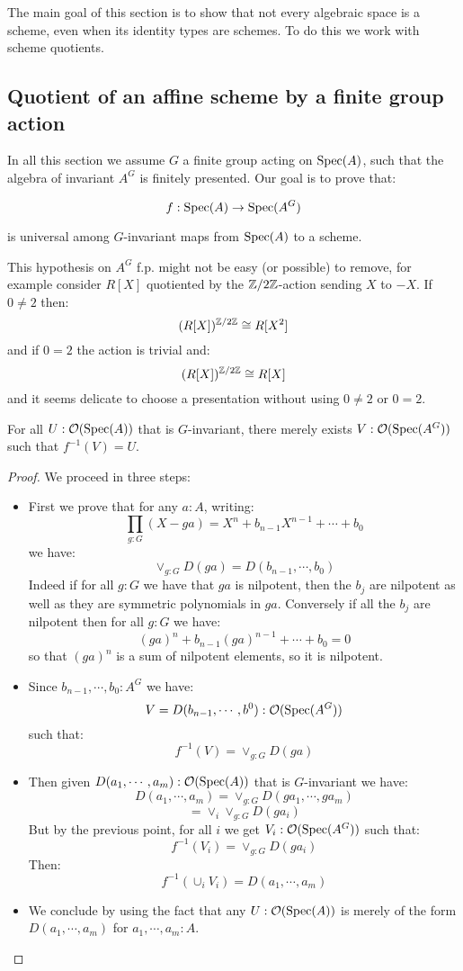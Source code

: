 The main goal of this section is to show that not every algebraic space is a scheme, even when its identity types are schemes. To do this we work with scheme quotients.

\subsection{Quotient of an affine scheme by a finite group action}

In all this section we assume $G$ a finite group acting on $\operatorname{Spec}(A)$, such that the algebra of invariant $A^G$ is finitely presented. Our goal is to prove that:

\[f:\operatorname{Spec}(A)\to \operatorname{Spec}(A^G)\] 

is universal among $G$-invariant maps from $\operatorname{Spec}(A)$ to a scheme.

\begin{remark}
This hypothesis on $A^G$ f.p. might not be easy (or possible) to remove, for example consider $R[X]$ quotiented by the $\mathbb{Z}/2\mathbb{Z}$-action sending $X$ to $-X$. If $0\not=2$ then:
\[(R[X])^{\mathbb{Z}/2\mathbb{Z}} \cong R[X^2]\]
and if $0=2$ the action is trivial and:
\[(R[X])^{\mathbb{Z}/2\mathbb{Z}} \cong R[X]\]
and it seems delicate to choose a presentation without using  $0\not=2$ or $0=2$.
\end{remark}

\begin{lemma}\label{surjective-on-open}
For all $U: \mathcal{O}(\operatorname{Spec}(A))$ that is $G$-invariant, there merely exists $V:\mathcal{O}(\operatorname{Spec}(A^G))$ such that $f^{-1}(V)=U$.
\end{lemma}

\begin{proof}
We proceed in three steps:
\begin{itemize}
\item First we prove that for any $a:A$, writing:
\[\prod_{g:G}(X-ga) = X^n + b_{n-1}X^{n-1} + \cdots + b_0\]
we have:
\[ \lor_{g:G} D(ga) = D(b_{n-1},\cdots,b_0)\]
Indeed if for all $g:G$ we have that $ga$ is nilpotent, then the $b_j$ are nilpotent as well as they are symmetric polynomials in $ga$. Conversely if all the $b_j$ are nilpotent then for all $g:G$ we have:
\[(ga)^n + b_{n-1}(ga)^{n-1} + \cdots + b_0 = 0\]
so that $(ga)^n$ is a sum of nilpotent elements, so it is nilpotent.

\item Since $b_{n-1},\cdots,b_0:A^G$ we have:
\[V = D(b_{n-1},\cdots,b^0):\mathcal{O}(\operatorname{Spec}(A^G))\]
such that:
\[f^{-1}(V) = \lor_{g:G} D(ga)\]

\item Then given $D(a_1,\cdots,a_m):\mathcal{O}(\operatorname{Spec}(A))$ that is $G$-invariant we have:
\[D(a_1,\cdots,a_m) = \lor_{g:G}D(ga_1,\cdots,ga_m)\]
\[= \lor_i\lor_{g:G}D(ga_i)\]
But by the previous point, for all $i$ we get $V_i:\mathcal{O}(\operatorname{Spec}(A^G))$ such that:
\[f^{-1}(V_i) = \lor_{g:G}D(ga_i)\]
Then:
\[f^{-1}(\cup_iV_i) = D(a_1,\cdots,a_m)\]

\item We conclude by using the fact that any $U:\mathcal{O}(\operatorname{Spec}(A))$ is merely of the form $D(a_1,\cdots,a_m)$ for $a_1,\cdots,a_m:A$.

\end{itemize}
\end{proof}

